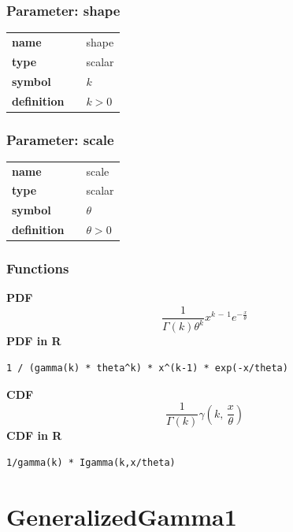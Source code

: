 \documentclass{article}
\begin{document}
\subsubsection*{Parameter: shape}

\noindent\begin{tabular}{p{2cm}cl}
\textbf{name} & & shape \\
\textbf{type} & & scalar \\
\textbf{symbol} & & $k$  \\
\textbf{definition} & & $k > 0$
\end{tabular}
\subsubsection*{Parameter: scale}

\noindent\begin{tabular}{p{2cm}cl}
\textbf{name} & & scale \\
\textbf{type} & & scalar \\
\textbf{symbol} & & $\theta$  \\
\textbf{definition} & & $\theta > 0$
\end{tabular}
\subsubsection*{Functions}

\smallskip \noindent \hspace{.2cm} \textbf{PDF} 
\begin{equation*}\frac{1}{\Gamma(k) \theta^k} x^{k \,-\, 1} e^{-\frac{x}{\theta}}\end{equation*}
\smallskip \noindent \hspace{.2cm} \textbf{PDF in R}  
\begin{verbatim}1 / (gamma(k) * theta^k) * x^(k-1) * exp(-x/theta)\end{verbatim}
\smallskip \noindent \hspace{.2cm} \textbf{CDF} 
\begin{equation*}\frac{1}{\Gamma(k)} \gamma\left(k,\, \frac{x}{\theta}\right)\end{equation*}
\smallskip \noindent \hspace{.2cm} \textbf{CDF in R} 
\begin{verbatim}1/gamma(k) * Igamma(k,x/theta)\end{verbatim}
\smallskip\section*{GeneralizedGamma1} 
\end{document}
